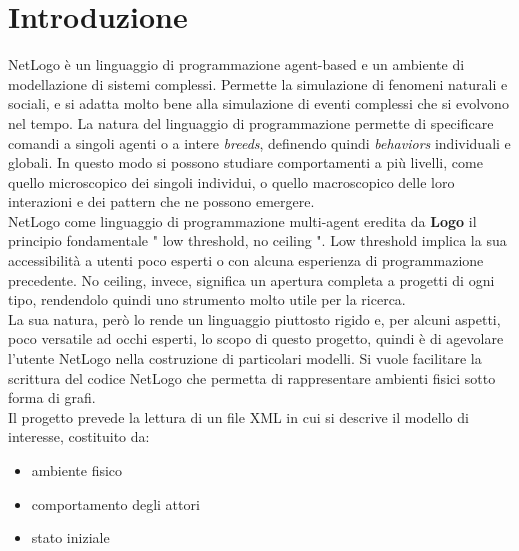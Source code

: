 \chapter{Introduzione}
NetLogo è un linguaggio di programmazione agent-based e un ambiente di modellazione di sistemi complessi. Permette la simulazione di fenomeni naturali e sociali, e si adatta molto bene alla simulazione di eventi complessi che si evolvono nel tempo. La natura del linguaggio di programmazione permette di specificare comandi a singoli agenti o a intere \textit{breeds}, definendo quindi \textit{behaviors} individuali e globali. In questo modo si possono studiare comportamenti a più livelli, come quello microscopico dei singoli individui, o quello macroscopico delle loro interazioni e dei pattern che ne possono emergere.\\
NetLogo come linguaggio di programmazione multi-agent eredita da \textbf{Logo} il principio fondamentale " low threshold, no ceiling ". Low threshold implica la sua accessibilità a utenti poco esperti o con alcuna esperienza di programmazione precedente. No ceiling, invece, significa un apertura completa a progetti di ogni tipo, rendendolo quindi uno strumento molto utile per la ricerca.\\
La sua natura, però lo rende un linguaggio piuttosto rigido e, per alcuni aspetti, poco versatile ad occhi esperti, lo scopo di questo progetto, quindi è di agevolare l'utente NetLogo nella costruzione di particolari modelli. Si vuole facilitare la scrittura del codice NetLogo che permetta di rappresentare ambienti fisici sotto forma di grafi.\\
Il progetto prevede la lettura di un file XML in cui si descrive il modello di interesse, costituito da:
\begin{itemize}
\item ambiente fisico
\item comportamento degli attori
\item stato iniziale 
\end{itemize} 